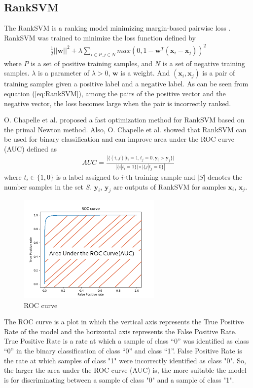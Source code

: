 \documentclass[a4paper,12pt]{article}
\begin{document}
\subsection{RankSVM}
The RankSVM is a ranking model minimizing margin-based pairwise loss \cite{Herbrich2000}.
RankSVM was trained to minimize the loss function defined by
\begin{align} \label{eq:RankSVM}
    \frac{1}{2}||{\bm w}||^2+\lambda \sum_{i \in P, j \in N}max(0, 1-{\bm w}^T({\bm x}_i - {\bm x}_j))^2
\end{align}
where $P$ is a set of positive training samples, and $N$ is a set of negative training samples. 
$\lambda$ is a parameter of $\lambda > 0$, ${\bm w}$ is a weight.
And $({\bm x}_i, {\bm x}_j)$ is a pair of training samples given a positive label and a negative label.
As can be seen from equation (\ref{eq:RankSVM}), among the pairs of the positive vector and the negative vector, the loss becomes large when the pair is incorrectly ranked.

O. Chapelle et al. \cite{Chapelle2010} proposed a fast optimization method for RankSVM based on the primal Newton method.
Also, O. Chapelle et al. showed that RankSVM can be used for binary classification and can improve area under the ROC curve (AUC) defined as 
\begin{align} \label{eq:AUC}
    AUC=\frac{|\{(i,j)| t_i=1, t_j=0, \bm{y}_i > \bm{y}_j \}|}{|\{i|t_i=1\}| \times |\{j|t_j=0\}|}
\end{align}
where $t_i \in \{1,0\}$ is a label assigned to $i$-th training sample and $|S|$ denotes the number samples in the set $S$.
$\bm{y}_i$, $\bm{y}_j$ are outputs of RankSVM for samples ${\bm x}_i$, ${\bm x}_j$.
\begin{figure}[ht]
\begin{center}
\includegraphics[width=70mm]{figure_ROC.png}
\caption{ROC curve}
\label{fig:triplet}
\end{center}
\end{figure}
The ROC curve is a plot in which the vertical axis represents the True Positive Rate of the model and the horizontal axis represents the False Positive Rate.
True Positive Rate is a rate at which a sample of class “0” was identified as class “0” in the binary classification of class “0” and class “1”.
False Positive Rate is the rate at which samples of class "1" were incorrectly identified as class "0".
So, the larger the area under the ROC curve (AUC) is, the more suitable the model is for discriminating between a sample of class "0" and a sample of class "1".
\end{document}
